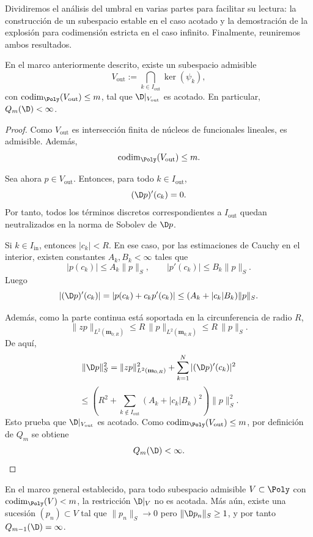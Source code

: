 Dividiremos el análisis del umbral en varias partes para facilitar su lectura: la construcción de un subespacio estable en el caso acotado y la demostración de la explosión para codimensión estricta en el caso infinito. Finalmente, reuniremos ambos resultados.

\begin{prop}\label{prop:umbral_fase1}
	En el marco anteriormente descrito, existe un subespacio admisible
	\[
		V_{\mathrm{out}}:=\bigcap_{k\in I_{\mathrm{out}}}\ker(\psi_k),
	\]
	con $\operatorname{codim}_{\Poly}(V_{\mathrm{out}})\le m$, tal que $\D|_{V_{\mathrm{out}}}$ es acotado. En particular, $Q_m(\D)<\infty$.
\end{prop}

\begin{proof}
	Como $V_{\mathrm{out}}$ es intersección finita de núcleos de funcionales lineales, es admisible.
	Además,
	\[
		\operatorname{codim}_{\Poly}(V_{\mathrm{out}})\le m.
	\]

	Sea ahora $p\in V_{\mathrm{out}}$. Entonces, para todo $k\in I_{\mathrm{out}}$,
	\[
		(\D p)'(c_k)=0.
	\]
	Por tanto, todos los términos discretos correspondientes a $I_{\mathrm{out}}$ quedan
	neutralizados en la norma de Sobolev de $\D p$.

	Si $k\in I_{\mathrm{in}}$, entonces $|c_k|<R$. En ese caso, por las estimaciones
	de Cauchy en el interior, existen constantes $A_k,B_k<\infty$ tales que
	\[
		|p(c_k)|\le A_k\|p\|_S,
		\qquad
		|p'(c_k)|\le B_k\|p\|_S.
	\]
	Luego
	\[
		|(\D p)'(c_k)|
		=
		|p(c_k)+c_kp'(c_k)|
		\le
		(A_k+|c_k|B_k)\|p\|_S.
	\]

	Además, como la parte continua está soportada en la circunferencia de radio $R$,
	\[
		\|zp\|_{L^2(\mathbf{m}_{0;R})}\le R\,\|p\|_{L^2(\mathbf{m}_{0;R})}\le R\,\|p\|_S.
	\]
	De aquí,
	\[
		\|\D p\|_S^2
		=
		\|zp\|_{L^2(\mathbf{m}_{0;R})}^2
		+
		\sum_{k=1}^N |(\D p)'(c_k)|^2
	\]
	\[
		\le
		\left(
		R^2+\sum_{k\notin I_{\mathrm{out}}}(A_k+|c_k|B_k)^2
		\right)\|p\|_S^2.
	\]
	Esto prueba que $\D|_{V_{\mathrm{out}}}$ es acotado. Como
	$\operatorname{codim}_{\Poly}(V_{\mathrm{out}})\le m$, por definición de $Q_m$ se obtiene
	\[
		Q_m(\D)<\infty.
	\]
\end{proof}

\begin{prop}\label{prop:umbral_fase2}
	En el marco general establecido, para todo subespacio admisible $V\subset\Poly$ con $\operatorname{codim}_{\Poly}(V)<m$, la restricción $\D|_V$ no es acotada. Más aún, existe una sucesión $(p_n)\subset V$ tal que $\|p_n\|_S\to 0$ pero $\|\D p_n\|_S\ge 1$, y por tanto $Q_{m-1}(\D)=\infty$.
\end{prop}

